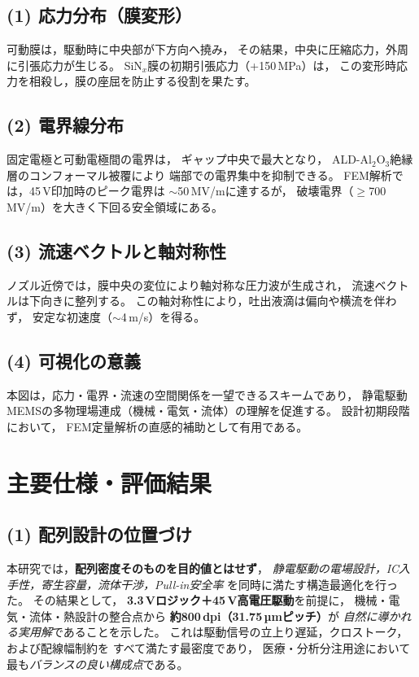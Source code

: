 \documentclass[conference]{IEEEtran}
\begin{document}
\subsection*{(1) 応力分布（膜変形）}
可動膜は，駆動時に中央部が下方向へ撓み，
その結果，中央に圧縮応力，外周に引張応力が生じる。
SiN$_x$膜の初期引張応力（+150\,MPa）は，
この変形時応力を相殺し，膜の座屈を防止する役割を果たす。

\subsection*{(2) 電界線分布}
固定電極と可動電極間の電界は，
ギャップ中央で最大となり，
ALD-Al$_2$O$_3$絶縁層のコンフォーマル被覆により
端部での電界集中を抑制できる。
FEM解析では，45\,V印加時のピーク電界は
$\sim$50\,MV/mに達するが，
破壊電界（$\ge$700\,MV/m）を大きく下回る安全領域にある。

\subsection*{(3) 流速ベクトルと軸対称性}
ノズル近傍では，膜中央の変位により軸対称な圧力波が生成され，
流速ベクトルは下向きに整列する。
この軸対称性により，吐出液滴は偏向や横流を伴わず，
安定な初速度（$\sim$4\,m/s）を得る。

\subsection*{(4) 可視化の意義}
本図は，応力・電界・流速の空間関係を一望できるスキームであり，
静電駆動MEMSの多物理場連成（機械・電気・流体）の理解を促進する。
設計初期段階において，
FEM定量解析の直感的補助として有用である。

\section{主要仕様・評価結果}

\subsection*{(1) 配列設計の位置づけ}
本研究では，\textbf{配列密度そのものを目的値とはせず}，
\emph{静電駆動の電場設計，IC入手性，寄生容量，流体干渉，Pull-in安全率}
を同時に満たす構造最適化を行った。
その結果として，
\textbf{3.3\,Vロジック＋45\,V高電圧駆動}を前提に，
機械・電気・流体・熱設計の整合点から
\textbf{約800\,dpi（31.75\,µmピッチ）}が
\emph{自然に導かれる実用解}であることを示した。
これは駆動信号の立上り遅延，クロストーク，および配線幅制約を
すべて満たす最密度であり，
医療・分析分注用途において最も\emph{バランスの良い構成点}である。
\end{document}
